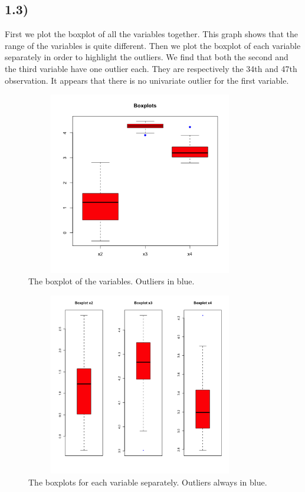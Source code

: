 \documentclass[a4paper,11pt,oneside]{report}
\begin{document}
\subsection*{1.3)}
	First we plot the boxplot of all the variables together. This graph shows that the range of the variables is quite different. Then we plot the boxplot of each variable separately in order to highlight the outliers.
	We find that both the second and the third variable have one outlier each. They are respectively the 34th and 47th observation. It appears that there is no univariate outlier for the first variable.
	\begin{figure}[H]
	\centering
	\includegraphics[width=10cm, height=8cm]{boxplot_same_scale.png}
	\caption{The boxplot of the variables. Outliers in blue.}
	\end{figure}
	\begin{figure}[H]
	\centering
	\includegraphics[width=10cm, height=8cm]{boxplots.png}
	\caption{The boxplots for each variable separately. Outliers always in blue.}
	\end{figure}
\end{document}
